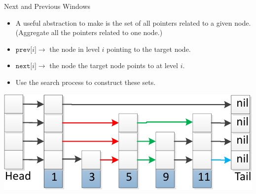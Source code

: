 \documentclass{beamer}
\begin{document}
\begin{frame}{Next and Previous Windows}
  \begin{itemize}
    \item A useful abstraction to make is the set of all pointers
      related to a given node. (Aggregate all the pointers related to one node.)
    \item $\mathtt{prev[}i\mathtt{]} \rightarrow$ the node in level $i$ pointing to the target node.
    \item $\mathtt{next[}i\mathtt{]} \rightarrow$ the node the target node points to at level $i$.
    \item Use the search process to construct these sets.
  \end{itemize}
  \begin{center}
    \includegraphics[scale=0.75]{img/skiplistInsert5-crop.pdf}
  \end{center}
\end{frame}
\end{document}
